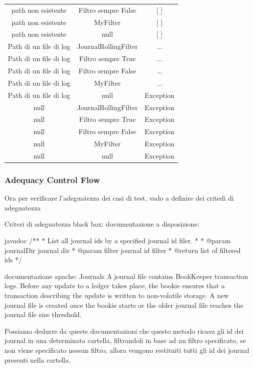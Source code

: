 \documentclass[12pt, a4paper]{article}
\begin{document}
\begin{table}[ht]
\begin{tabular}{|c|c|c|}
{path non esistente} & Filtro sempre False & [ ] \\
{path non esistente} & MyFilter & [ ] \\
{path non esistente} & null & [ ] \\
{Path di un file di log} & JournalRollingFilter & ... \\
{Path di un file di log} & Filtro sempre True & ... \\
{Path di un file di log} & Filtro sempre False & ... \\
{Path di un file di log} & MyFilter & ... \\
{Path di un file di log} & null & Exception \\
null & JournalRollingFilter & Exception \\
null & Filtro sempre True & Exception \\
null & Filtro sempre False & Exception \\
null & MyFilter & Exception \\
null & null & Exception \\
\hline
\end{tabular}
\end{table}

\subsubsection{Adequacy Control Flow}
Ora per verificare l'adeguatezza dei casi di test, vado a definire dei critedi di adeguatezza

Criteri di adeguatezza black box:
documentazione a disposizione:

javadoc
/**
* List all journal ids by a specified journal id filer.
*
* @param journalDir journal dir
* @param filter journal id filter
* @return list of filtered ids
*/

 documentazione apache:
 Journals
A journal file contains BookKeeper transaction logs. 
Before any update to a ledger takes place, the bookie ensures that a transaction describing 
the update is written to non-volatile storage. A new journal file is created once the bookie 
starts or the older journal file reaches the journal file size threshold.

Possiamo dedurre da queste documentazioni che questo metodo ricava gli id dei journal in una 
determinata cartella, filtrandoli in base ad un filtro specificato, se non viene specificato 
nessun filtro, allora vengono restituiti tutti gli id dei journal presenti nella cartella.
\end{document}
